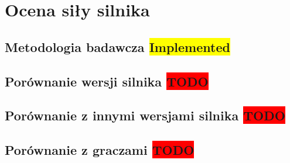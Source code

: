 
\chapter {Ocena siły silnika}
\label {ch: ocena-sily-silnika}

\section {Metodologia badawcza \colorbox{yellow}{Implemented}}
\label {sec: metodologia-badawcza}

\section {Porównanie wersji silnika \colorbox{red}{TODO}}
\label {sec: porownanie-wersji-silnika}

\section {Porównanie z innymi wersjami silnika \colorbox{red}{TODO}}
\label {sec: porownianie-z-silnikami}

\section {Porównanie z graczami \colorbox{red}{TODO}}
\label {sec: porownanie-z-graczami}

